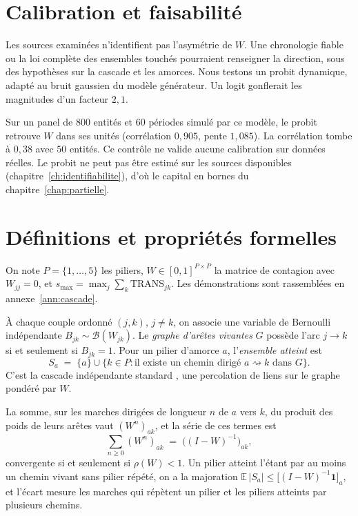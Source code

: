 
\section{Calibration et faisabilité}
\label{sec:calib-cascade}

Les sources examinées n'identifient pas l'asymétrie de $W$. Une chronologie fiable ou la loi complète des ensembles touchés pourraient renseigner la direction,
sous des hypothèses sur la cascade et les amorces. Nous testons un probit dynamique, adapté au bruit gaussien du modèle générateur.
Un logit gonflerait les magnitudes d'un facteur $2{,}1$.

Sur un panel de $800$ entités et $60$ périodes simulé par ce modèle, le probit retrouve $W$ dans ses unités (corrélation $0{,}905$, pente $1{,}085$).
La corrélation tombe à $0{,}38$ avec $50$ entités. Ce contrôle ne valide aucune calibration sur données réelles.
Le probit ne peut pas être estimé sur les sources disponibles (chapitre~\ref{ch:identifiabilite}), d'où le capital en bornes du chapitre~\ref{chap:partielle}.


\section{Définitions et propriétés formelles}
\label{sec:formalisation}

On note
$P=\{1,\dots,5\}$ les piliers, $W\in[0,1]^{P\times P}$ la matrice de contagion avec
$W_{jj}=0$, et $s_{\max}=\max_j\sum_k \mathrm{TRANS}_{jk}$. Les démonstrations sont
rassemblées en annexe~\ref{ann:cascade}.

\begin{definition}
\label{def:cascade}
À chaque couple ordonné $(j,k)$, $j\neq k$, on associe une variable de Bernoulli
indépendante $B_{jk}\sim\mathcal B(W_{jk})$. Le \emph{graphe d'arêtes vivantes} $G$ possède
l'arc $j\to k$ si et seulement si $B_{jk}=1$. Pour un pilier d'amorce $a$, l'\emph{ensemble
atteint} est
\[
  S_a \;=\; \{a\}\cup\{k\in P : \text{il existe un chemin dirigé } a\rightsquigarrow k \text{ dans } G\}.
\]
C'est la cascade indépendante standard \citep{kempe2003}, une percolation de liens sur le graphe pondéré par $W$.
\end{definition}

\begin{proposition}
\label{prop:reduite}
La somme, sur les marches dirigées de longueur $n$ de $a$ vers $k$, du produit des poids de
leurs arêtes vaut $(W^n)_{ak}$, et la série de ces termes est
\[
  \sum_{n\ge 0}(W^n)_{ak} \;=\; \bigl((I-W)^{-1}\bigr)_{ak},
\]
convergente si et seulement si $\rho(W)<1$. Un pilier atteint l'étant par au moins un chemin vivant
sans pilier répété, on a la majoration $\mathbb E\,|S_a|\le \bigl[(I-W)^{-1}\mathbf 1\bigr]_a$, et
l'écart mesure les marches qui répètent un pilier et les piliers atteints par plusieurs chemins.
\end{proposition}

